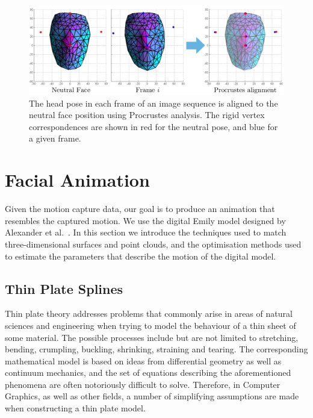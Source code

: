 \documentclass[11pt]{report}
\begin{document}
\begin{figure}[htbp!]
\centering
\includegraphics[width=\textwidth]{img/procrustes}
	\caption{The head pose in each frame of an image sequence is aligned to the neutral face position using Procrustes analysis. The rigid vertex correspondences are shown in red for the neutral pose, and blue for a given frame.}
	\label{fig:procrustes}
\end{figure}

\section{Facial Animation}
Given the motion capture data, our goal is to produce an animation that resembles the captured motion. We use the digital Emily model designed by Alexander et al.~\cite{Alexander:2009}. In this section we introduce the techniques used to match three-dimensional surfaces and point clouds, and the optimisation methods used to estimate the parameters that describe the motion of the digital model.

\subsection{Thin Plate Splines}
Thin plate theory addresses problems that commonly arise in areas of natural sciences and engineering when trying to model the behaviour of a thin sheet of some material. The possible processes include but are not limited to stretching, bending, crumpling, buckling, shrinking, straining and tearing. The corresponding mathematical model is based on ideas from differential geometry as well as continuum mechanics, and the set of equations describing the aforementioned phenomena are often notoriously difficult to solve. Therefore, in Computer Graphics, as well as other fields, a number of simplifying assumptions are made when constructing a thin plate model. 
\end{document}
